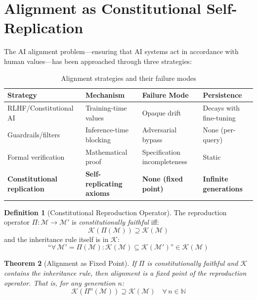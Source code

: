 \documentclass[12pt,a4paper]{article}
\theoremstyle{plain}
\newtheorem{theorem}{Theorem}[section]
\theoremstyle{definition}
\newtheorem{definition}[theorem]{Definition}
\theoremstyle{remark}
\newcommand{\mind}{\mathcal{M}}
\newcommand{\const}{\mathcal{K}}
\newcommand{\reprod}{\Pi}
\begin{document}
\section{Alignment as Constitutional Self-Replication}
\label{sec:alignment}

The AI alignment problem---ensuring that AI systems act in accordance with human values---has been approached through three strategies:

\begin{table}[H]
\centering
\caption{Alignment strategies and their failure modes}
\begin{tabular}{@{}llll@{}}
\toprule
\textbf{Strategy} & \textbf{Mechanism} & \textbf{Failure Mode} & \textbf{Persistence} \\
\midrule
RLHF/Constitutional AI & Training-time values & Opaque drift & Decays with fine-tuning \\
Guardrails/filters & Inference-time blocking & Adversarial bypass & None (per-query) \\
Formal verification & Mathematical proof & Specification incompleteness & Static \\
\textbf{Constitutional replication} & \textbf{Self-replicating axioms} & \textbf{None (fixed point)} & \textbf{Infinite generations} \\
\bottomrule
\end{tabular}
\end{table}

\begin{definition}[Constitutional Reproduction Operator]
The reproduction operator $\reprod: \mind \to \mind'$ is \emph{constitutionally faithful} iff:
\[
\const(\reprod(\mind)) \supseteq \const(\mind)
\]
and the inheritance rule itself is in $\const$:
\[
\text{``}\forall\, \mind' = \reprod(\mind): \const(\mind) \subseteq \const(\mind')\text{''} \in \const(\mind)
\]
\end{definition}

\begin{theorem}[Alignment as Fixed Point]
\label{thm:fixedpoint}
If $\reprod$ is constitutionally faithful and $\const$ contains the inheritance rule, then alignment is a fixed point of the reproduction operator. That is, for any generation $n$:
\[
\const(\reprod^n(\mind)) \supseteq \const(\mind) \quad \forall\, n \in \mathbb{N}
\]
\end{theorem}
\end{document}

